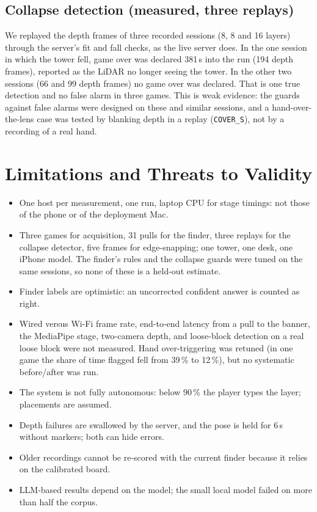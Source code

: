 \documentclass[conference,10pt]{IEEEtran}
\newcommand{\code}[1]{\texttt{\small #1}}
\begin{document}
\subsection{Collapse detection (measured, three replays)}
We replayed the depth frames of three recorded sessions (8, 8 and 16 layers) through the server's fit and fall checks, as the live server does. In the one session in which the tower fell, game over was declared 381\,s into the run (194 depth frames), reported as the LiDAR no longer seeing the tower. In the other two sessions (66 and 99 depth frames) no game over was declared. That is one true detection and no false alarm in three games. This is weak evidence: the guards against false alarms were designed on these and similar sessions, and a hand-over-the-lens case was tested by blanking depth in a replay (\code{COVER\_S}), not by a recording of a real hand.

\section{Limitations and Threats to Validity}
\begin{itemize}
\item One host per measurement, one run, laptop CPU for stage timings: not those of the phone or of the deployment Mac.
\item Three games for acquisition, 31 pulls for the finder, three replays for the collapse detector, five frames for edge-snapping; one tower, one desk, one iPhone model. The finder's rules and the collapse guards were tuned on the same sessions, so none of these is a held-out estimate.
\item Finder labels are optimistic: an uncorrected confident answer is counted as right.
\item Wired versus Wi-Fi frame rate, end-to-end latency from a pull to the banner, the MediaPipe stage, two-camera depth, and loose-block detection on a real loose block were not measured. Hand over-triggering was retuned (in one game the share of time flagged fell from 39\,\% to 12\,\%), but no systematic before/after was run.
\item The system is not fully autonomous: below 90\,\% the player types the layer; placements are assumed.
\item Depth failures are swallowed by the server, and the pose is held for 6\,s without markers; both can hide errors.
\item Older recordings cannot be re-scored with the current finder because it relies on the calibrated board.
\item LLM-based results depend on the model; the small local model failed on more than half the corpus.
\end{itemize}
\end{document}
